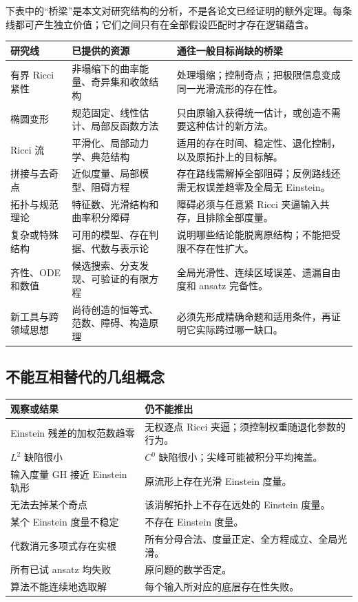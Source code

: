 \documentclass[11pt,a4paper]{article}
\theoremstyle{definition}
\begin{document}
下表中的“桥梁”是本文对研究结构的分析，不是各论文已经证明的额外定理。每条线都可产生独立价值；它们之间只有在全部假设匹配时才存在逻辑蕴含。

\begin{longtable}{P{0.18\textwidth}P{0.33\textwidth}P{0.40\textwidth}}
\toprule
研究线 & 已提供的资源 & 通往一般目标尚缺的桥梁\\\midrule\endhead
有界 Ricci 紧性 & 非塌缩下的曲率能量、奇异集和收敛结构 & 处理塌缩；控制奇点；把极限信息变成同一光滑流形的存在性。\\
椭圆变形 & 规范固定、线性估计、局部反函数方法 & 只由原输入获得统一估计，或创造不需要这种估计的新方法。\\
Ricci 流 & 平滑化、局部动力学、典范结构 & 适用的存在时间、稳定性、退化控制，以及原拓扑上的目标解。\\
拼接与去奇点 & 近似度量、局部模型、阻碍方程 & 存在路线需解掉全部阻碍；反例路线还需无权误差趋零及全局无 Einstein。\\
拓扑与规范理论 & 特征数、光滑结构和曲率积分障碍 & 障碍必须与任意紧 Ricci 夹逼输入共存，且排除全部度量。\\
复杂或特殊结构 & 可用的模型、存在判据、代数与表示论 & 说明哪些结论能脱离原结构；不能把受限不存在性扩大。\\
齐性、ODE和数值 & 候选搜索、分支发现、可验证的有限方程 & 全局光滑性、连续区域误差、遗漏自由度和 ansatz 完备性。\\
新工具与跨领域思想 & 尚待创造的恒等式、范数、障碍、构造原理 & 必须先形成精确命题和适用条件，再证明它实际跨过哪一缺口。\\\bottomrule
\end{longtable}

\subsection{不能互相替代的几组概念}

\begin{longtable}{P{0.36\textwidth}P{0.57\textwidth}}
\toprule
观察或结果 & 仍不能推出\\\midrule
Einstein 残差的加权范数趋零 & 无权逐点 Ricci 夹逼；须控制权重随退化参数的行为。\\
$L^2$ 缺陷很小 & $C^0$ 缺陷很小；尖峰可能被积分平均掩盖。\\
输入度量 GH 接近 Einstein 轨形 & 原流形上存在光滑 Einstein 度量。\\
无法去掉某个奇点 & 该消解拓扑上不存在远处的 Einstein 度量。\\
某个 Einstein 度量不稳定 & 不存在 Einstein 度量。\\
代数消元多项式存在实根 & 所有分母合法、度量正定、全方程成立、全局光滑。\\
所有已试 ansatz 均失败 & 原问题的数学否定。\\
算法不能连续地选取解 & 每个输入所对应的底层存在性失败。\\\bottomrule
\end{longtable}
\end{document}
